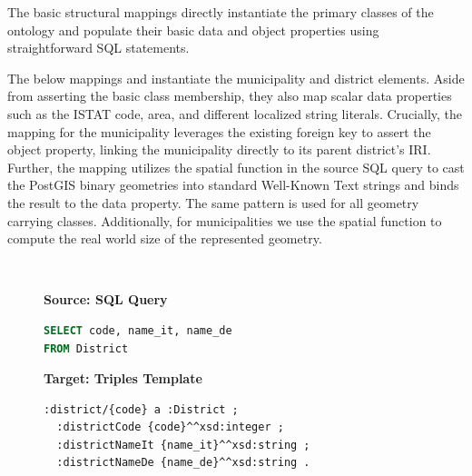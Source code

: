 The basic structural mappings directly instantiate the primary classes of the ontology and populate their basic data and object properties using straightforward SQL  statements.

The below mappings  and  instantiate the municipality and district elements. Aside from asserting the basic class membership, they also map scalar data properties such as the ISTAT code, area, and different localized string literals. Crucially, the mapping for the municipality leverages the existing foreign key  to assert the  object property, linking the municipality directly to its parent district's IRI.
Further, the mapping utilizes the spatial function   in the source SQL query to cast the PostGIS binary geometries into standard Well-Known Text strings and binds the result to the  data property. The same pattern is used for all geometry carrying classes. Additionally, for municipalities we use the spatial function  to compute the real world size of the represented geometry.

\begin{figure}[ht!]
  \vspace*{-1mm}
  \textbf{\small{}} \\
  \begin{minipage}[t]{0.50\textwidth}
    \centering
    \textbf{\scriptsize Source: SQL Query}
\begin{lstlisting}[language=SQL]
SELECT code, name_it, name_de
FROM District
\end{lstlisting}
  \end{minipage}
  \hfill
  \begin{minipage}[t]{0.50\textwidth}
    \centering
    \textbf{\scriptsize Target: Triples Template}
\begin{lstlisting}[language=Turtle]
:district/{code} a :District ;
  :districtCode {code}^^xsd:integer ;
  :districtNameIt {name_it}^^xsd:string ;
  :districtNameDe {name_de}^^xsd:string .
\end{lstlisting}
  \end{minipage}
  \vspace*{-4mm}
\end{figure}

